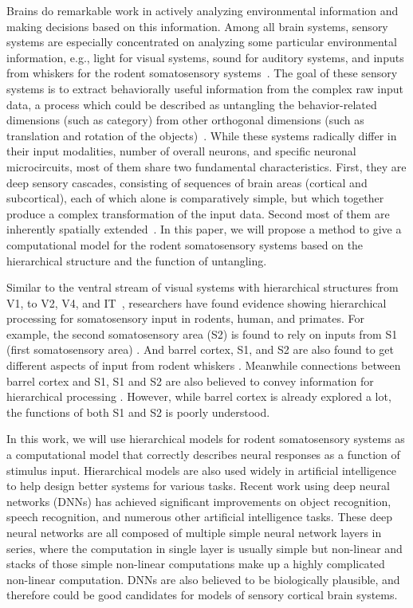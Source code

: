Brains do remarkable work in actively analyzing environmental information and making decisions based on this information. Among all brain systems, sensory systems are especially concentrated on analyzing some particular environmental information, e.g., light for visual systems, sound for auditory systems, and inputs from whiskers for the rodent somatosensory systems~\cite{purves2001neuroscience}.
The goal of these sensory systems is to extract behaviorally useful information from the complex raw input data, a process which could be described as untangling the behavior-related dimensions (such as category) from other orthogonal dimensions (such as translation and rotation of the objects)~\cite{yamins2016using}.
While these systems radically differ in their input modalities, number of overall neurons, and specific neuronal microcircuits, most of them share two fundamental characteristics. First, they are deep sensory cascades, consisting of sequences of brain areas (cortical and subcortical), each of which alone is comparatively simple, but which together produce a complex transformation of the input data. Second most of them are inherently spatially extended~\cite{felleman1991distributed}.
In this paper, we will propose a method to give a computational model for the rodent somatosensory systems based on the hierarchical structure and the function of untangling.

Similar to the ventral stream of visual systems with hierarchical structures from V1, to V2, V4, and IT~\cite{felleman1991distributed, Goodale1992}, researchers have found evidence showing hierarchical processing for somatosensory input in rodents, human, and primates\cite{Pons1987, Inui2004, Iwamura1998}. For example, the second somatosensory area (S2) is found to rely on inputs from S1 (first somatosensory area) \cite{Pons1987, Petersen2007}. And barrel cortex, S1, and S2 are also found to get different aspects of input from rodent whiskers \cite{Diamond2008}. Meanwhile connections between barrel cortex and S1, S1 and S2 are also believed to convey information for hierarchical processing \cite{Petersen2007}. However, while barrel cortex is already explored a lot, the functions of both S1 and S2 is poorly understood.

In this work, we will use hierarchical models for rodent somatosensory systems as a computational model that correctly describes neural responses as a function of stimulus input.
Hierarchical models are also used widely in artificial intelligence to help design better systems for various tasks. Recent work using deep neural networks (DNNs) has achieved significant improvements on object recognition, speech recognition, and numerous other artificial intelligence tasks\cite{Krizhevsky, hinton2012deep, lecun2015deep}.
These deep neural networks are all composed of multiple simple neural network layers in series, where the computation in single layer is usually simple but non-linear and stacks of those simple non-linear computations make up a highly complicated non-linear computation.
DNNs are also believed to be biologically plausible, and therefore could be good candidates for models of sensory cortical brain systems.

